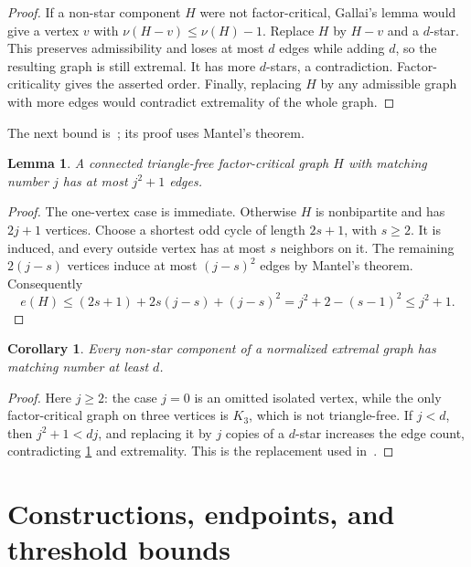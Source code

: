 \documentclass[11pt]{article}
\newtheorem{lemma}[theorem]{Lemma}
\newtheorem{corollary}[theorem]{Corollary}
\theoremstyle{definition}
\theoremstyle{remark}
\begin{document}
\begin{proof}
If a non-star component $H$ were not factor-critical, Gallai's lemma would
give a vertex $v$ with $\nu(H-v)\le\nu(H)-1$. Replace $H$ by $H-v$ and a
$d$-star. This preserves admissibility and loses at most $d$ edges while
adding $d$, so the resulting graph is still extremal. It has more $d$-stars,
a contradiction. Factor-criticality gives the asserted order. Finally,
replacing $H$ by any admissible graph with more edges would contradict
extremality of the whole graph.
\end{proof}

The next bound is~\cite[Lemma~3.1]{AEY2022}; its proof uses Mantel's theorem.

\begin{lemma}\label{lem:fc-order-bound}
A connected triangle-free factor-critical graph $H$ with matching number
$j$ has at most $j^2+1$ edges.
\end{lemma}

\begin{proof}
The one-vertex case is immediate. Otherwise $H$ is nonbipartite and has
$2j+1$ vertices. Choose a shortest odd cycle of length $2s+1$, with $s\ge2$.
It is induced, and every outside vertex has at most $s$ neighbors on it.
The remaining $2(j-s)$ vertices induce at most $(j-s)^2$ edges by Mantel's
theorem. Consequently
\[
  e(H)\le(2s+1)+2s(j-s)+(j-s)^2
        =j^2+2-(s-1)^2\le j^2+1.
\]
\end{proof}

\begin{corollary}\label{lem:component-lower}
Every non-star component of a normalized extremal graph has matching number
at least $d$.
\end{corollary}

\begin{proof}
Here $j\ge2$: the case $j=0$ is an omitted isolated vertex, while the only
factor-critical graph on three vertices is $K_3$, which is not triangle-free.
If $j<d$, then
$j^2+1<dj$, and replacing it by $j$ copies of a $d$-star increases the edge
count, contradicting \cref{lem:fc-order-bound} and extremality.
This is the replacement used in~\cite[Lemma~3.2]{AEY2022}.
\end{proof}

\section{Constructions, endpoints, and threshold bounds}\label{sec:foundations}
\end{document}
